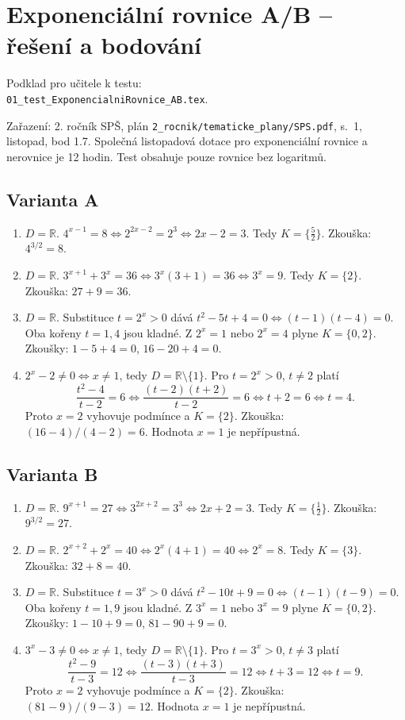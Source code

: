 \documentclass[a4paper,10pt]{article}
\begin{document}
\section*{Exponenciální rovnice A/B -- řešení a bodování}
Podklad pro učitele k testu:\\
\texttt{01\_test\_ExponencialniRovnice\_AB.tex}.

Zařazení: 2. ročník SPŠ, plán \texttt{2\_rocnik/tematicke\_plany/SPS.pdf},
s.~1, listopad, bod 1.7. Společná listopadová dotace pro exponenciální
rovnice a nerovnice je 12 hodin. Test obsahuje pouze rovnice bez logaritmů.

\subsection*{Varianta A}
\begin{enumerate}
\item $D=\mathbb{R}$. $4^{x-1}=8 \iff 2^{2x-2}=2^3 \iff 2x-2=3$.
Tedy $K=\{\frac52\}$. Zkouška: $4^{3/2}=8$.
\item $D=\mathbb{R}$. $3^{x+1}+3^x=36 \iff 3^x(3+1)=36 \iff 3^x=9$.
Tedy $K=\{2\}$. Zkouška: $27+9=36$.
\item $D=\mathbb{R}$. Substituce $t=2^x>0$ dává
$t^2-5t+4=0 \iff (t-1)(t-4)=0$. Oba kořeny $t=1,4$ jsou kladné.
Z $2^x=1$ nebo $2^x=4$ plyne $K=\{0,2\}$.
Zkoušky: $1-5+4=0$, $16-20+4=0$.
\item $2^x-2\ne0 \iff x\ne1$, tedy $D=\mathbb{R}\setminus\{1\}$.
Pro $t=2^x>0$, $t\ne2$ platí
\[
\frac{t^2-4}{t-2}=6
\iff \frac{(t-2)(t+2)}{t-2}=6
\iff t+2=6 \iff t=4.
\]
Proto $x=2$ vyhovuje podmínce a $K=\{2\}$.
Zkouška: $(16-4)/(4-2)=6$. Hodnota $x=1$ je nepřípustná.
\end{enumerate}

\subsection*{Varianta B}
\begin{enumerate}
\item $D=\mathbb{R}$. $9^{x+1}=27 \iff 3^{2x+2}=3^3 \iff 2x+2=3$.
Tedy $K=\{\frac12\}$. Zkouška: $9^{3/2}=27$.
\item $D=\mathbb{R}$. $2^{x+2}+2^x=40 \iff 2^x(4+1)=40 \iff 2^x=8$.
Tedy $K=\{3\}$. Zkouška: $32+8=40$.
\item $D=\mathbb{R}$. Substituce $t=3^x>0$ dává
$t^2-10t+9=0 \iff (t-1)(t-9)=0$. Oba kořeny $t=1,9$ jsou kladné.
Z $3^x=1$ nebo $3^x=9$ plyne $K=\{0,2\}$.
Zkoušky: $1-10+9=0$, $81-90+9=0$.
\item $3^x-3\ne0 \iff x\ne1$, tedy $D=\mathbb{R}\setminus\{1\}$.
Pro $t=3^x>0$, $t\ne3$ platí
\[
\frac{t^2-9}{t-3}=12
\iff \frac{(t-3)(t+3)}{t-3}=12
\iff t+3=12 \iff t=9.
\]
Proto $x=2$ vyhovuje podmínce a $K=\{2\}$.
Zkouška: $(81-9)/(9-3)=12$. Hodnota $x=1$ je nepřípustná.
\end{enumerate}
\end{document}
